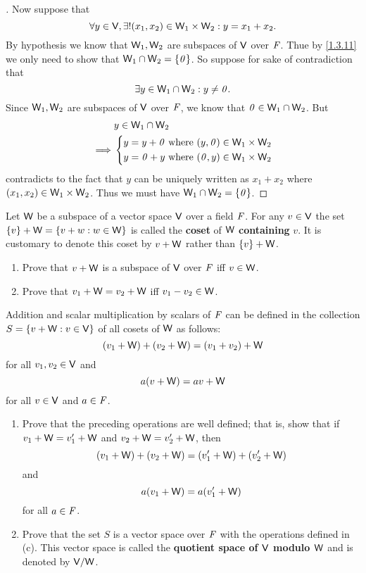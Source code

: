 \begin{proof}[]
	Now suppose that
	\[
		\forall y \in \mathsf{V}, \exists! (x_1, x_2) \in \mathsf{W}_1 \times \mathsf{W}_2 : y = x_1 + x_2.
	\]
	By hypothesis we know that \(\mathsf{W}_1, \mathsf{W}_2\) are subspaces of \(\mathsf{V}\) over \(\mathit{F}\).
	Thue by \cref{1.3.11} we only need to show that \(\mathsf{W}_1 \cap \mathsf{W}_2 = \left\lbrace\mathit{0}\right\rbrace\).
	So suppose for sake of contradiction that
	\[
		\exists y \in \mathsf{W}_1 \cap \mathsf{W}_2 : y \neq \mathit{0}.
	\]
	Since \(\mathsf{W}_1, \mathsf{W}_2\) are subspaces of \(\mathsf{V}\) over \(\mathit{F}\), we know that \(\mathit{0} \in \mathsf{W}_1 \cap \mathsf{W}_2\).
	But
	\begin{align*}
		         & y \in \mathsf{W}_1 \cap \mathsf{W}_2                                     \\
		\implies & \begin{dcases}
			           y = y + \mathit{0} \text{ where } (y, \mathit{0}) \in \mathsf{W}_1 \times \mathsf{W}_2 \\
			           y = \mathit{0} + y \text{ where } (\mathit{0}, y) \in \mathsf{W}_1 \times \mathsf{W}_2
		           \end{dcases}
	\end{align*}
	contradicts to the fact that \(y\) can be uniquely written as \(x_1 + x_2\) where \((x_1, x_2) \in \mathsf{W}_1 \times \mathsf{W}_2\).
	Thus we must have \(\mathsf{W}_1 \cap \mathsf{W}_2 = \left\lbrace\mathit{0}\right\rbrace\).
\end{proof}

\begin{ex}\label{ex:1.3.31}
	Let \(\mathsf{W}\) be a subspace of a vector space \(\mathsf{V}\) over a field \(\mathit{F}\).
	For any \(v \in \mathsf{V}\) the set \(\left\lbrace v\right\rbrace + \mathsf{W} = \left\lbrace v + w : w \in \mathsf{W}\right\rbrace\) is called the \textbf{coset} of \(\mathsf{W}\) \textbf{containing} \(v\).
	It is customary to denote this coset by \(v + \mathsf{W}\) rather than \(\left\lbrace v\right\rbrace + \mathsf{W}\).
	\begin{enumerate}
		\item Prove that \(v + \mathsf{W}\) is a subspace of \(\mathsf{V}\) over \(\mathit{F}\) iff \(v \in \mathsf{W}\).
		\item Prove that \(v_1 + \mathsf{W} = v_2 + \mathsf{W}\) iff \(v_1 - v_2 \in \mathsf{W}\).
	\end{enumerate}
	Addition and scalar multiplication by scalars of \(\mathit{F}\) can be defined in the collection \(S = \left\lbrace v + \mathsf{W} : v \in \mathsf{V}\right\rbrace\) of all cosets of \(\mathsf{W}\) as follows:
	\[
		(v_1 + \mathsf{W}) + (v_2 + \mathsf{W}) = (v_1 + v_2) + \mathsf{W}
	\]
	for all \(v_1, v_2 \in \mathsf{V}\) and
	\[
		a(v + \mathsf{W}) = av + \mathsf{W}
	\]
	for all \(v \in \mathsf{V}\) and \(a \in \mathit{F}\).
	\begin{enumerate}[resume]
		\item Prove that the preceding operations are well defined;
		      that is, show that if \(v_1 + \mathsf{W} = v_1' + \mathsf{W}\) and \(v_2 + \mathsf{W} = v_2' + \mathsf{W}\), then
		      \[
			      (v_1 + \mathsf{W}) + (v_2 + \mathsf{W}) = (v_1' + \mathsf{W}) + (v_2' + \mathsf{W})
		      \]
		      and
		      \[
			      a(v_1 + \mathsf{W}) = a(v_1' + \mathsf{W})
		      \]
		      for all \(a \in \mathit{F}\).
		\item Prove that the set \(S\) is a vector space over \(\mathit{F}\) with the operations defined in (c).
		      This vector space is called the \textbf{quotient space of \(\mathsf{V}\) modulo \(\mathsf{W}\)} and is denoted by \(\mathsf{V} / \mathsf{W}\).
	\end{enumerate}
\end{ex}

